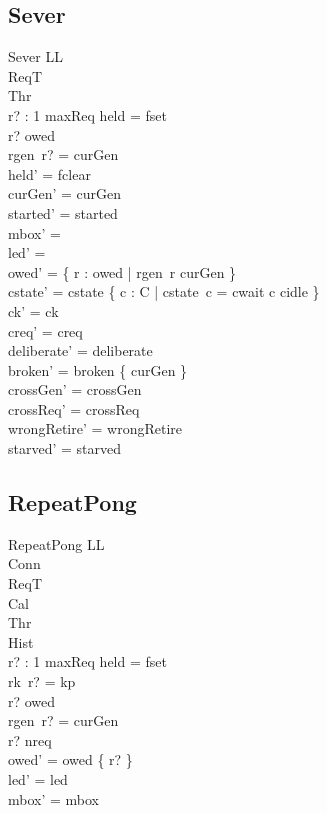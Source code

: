 \documentclass[a4paper,10pt,fleqn]{article}
\begin{document}
\subsection{Sever}

\begin{schema}{Sever}
  \Delta LL \\
  \Xi ReqT \\
  \Xi Thr \\
  r? : 1 \upto maxReq
\where
  held = fset \\
  r? \in owed \\
  rgen~r? = curGen \\
  held' = fclear \\
  curGen' = curGen \\
  started' = started \\
  mbox' = \emptyset \\
  led' = \emptyset \\
  owed' = \{ r : owed | rgen~r \neq curGen \} \\
  cstate' = cstate \oplus \{ c : C | cstate~c = cwait \spot c \mapsto cidle \} \\
  ck' = ck \\
  creq' = creq \\
  deliberate' = deliberate \\
  broken' = broken \cup \{ curGen \} \\
  crossGen' = crossGen \\
  crossReq' = crossReq \\
  wrongRetire' = wrongRetire \\
  starved' = starved
\end{schema}

\subsection{RepeatPong}

\begin{schema}{RepeatPong}
  \Delta LL \\
  \Xi Conn \\
  \Xi ReqT \\
  \Xi Cal \\
  \Xi Thr \\
  \Xi Hist \\
  r? : 1 \upto maxReq
\where
  held = fset \\
  rk~r? = kp \\
  r? \notin owed \\
  rgen~r? = curGen \\
  r? \leq nreq \\
  owed' = owed \cup \{ r? \} \\
  led' = led \\
  mbox' = mbox
\end{schema}
\end{document}
